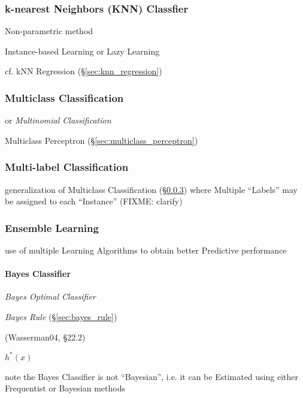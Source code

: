 \subsubsection{k-nearest Neighbors (KNN) Classfier}\label{sec:knn_classifier}

Non-parametric method

Instance-based Learning or Lazy Learning

cf. kNN Regression (\S\ref{sec:knn_regression})



\subsubsection{Multiclass Classification}\label{sec:multiclass}

or \emph{Multinomial Classification}

Multiclass Perceptron (\S\ref{sec:multiclass_perceptron})



\subsubsection{Multi-label Classification}\label{sec:multiclass}

generalization of Multiclass Classification (\S\ref{sec:multiclass}) where
Multiple ``Labels'' may be assigned to each ``Instance'' (FIXME: clarify)



\subsubsection{Ensemble Learning}\label{sec:ensemble_learning}

use of multiple Learning Algorithms to obtain better Predictive performance



\paragraph{Bayes Classifier}\label{sec:bayes_classifier}\hfill

\emph{Bayes Optimal Classifier}

\emph{Bayes Rule} (\S\ref{sec:bayes_rule})

(Wasserman04, \S22.2)

$h^*(x)$

note the Bayes Classifier is not ``Bayesian'', i.e. it can be Estimated using
either Frequentist or Bayesian methods

